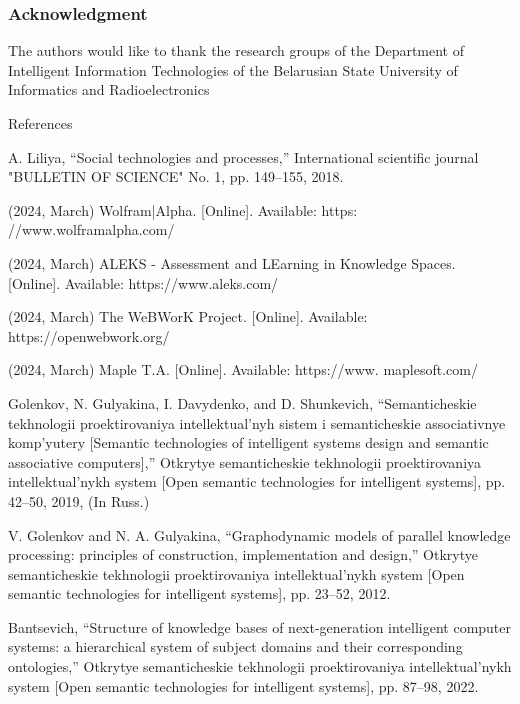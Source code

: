 \documentclass [11pt, a4paper]{article}
\begin{document}
\begin{multicols}{2}
\begin{center}
    \subsubsection*{\textmd{\normalsize{Acknowledgment}}}
\end{center}
\par \quad The authors would like to thank the research groups of the Department of Intelligent Information Technologies of the Belarusian State University of Informatics and Radioelectronics
\\\quad
\begin{center}
    References
\end{center}
\begin{enumerate}
  \scriptsize{\item A. Liliya, “Social technologies and processes,” International
scientific journal "BULLETIN OF SCIENCE" No. 1, pp. 149–155,
2018.
\item (2024, March) Wolfram|Alpha. [Online]. Available: https:
//www.wolframalpha.com/
\item(2024, March) ALEKS - Assessment and LEarning in Knowledge
Spaces. [Online]. Available: https://www.aleks.com/
\item (2024, March) The WeBWorK Project. [Online]. Available:
https://openwebwork.org/
\item (2024, March) Maple T.A. [Online]. Available: https://www.
maplesoft.com/
\item Golenkov, N. Gulyakina, I. Davydenko, and D. Shunkevich,
“Semanticheskie tekhnologii proektirovaniya intellektual’nyh
sistem i semanticheskie associativnye komp’yutery [Semantic
technologies of intelligent systems design and semantic
associative computers],” Otkrytye semanticheskie tekhnologii
proektirovaniya intellektual’nykh system [Open semantic
technologies for intelligent systems], pp. 42–50, 2019, (In Russ.)
\item V. Golenkov and N. A. Gulyakina, “Graphodynamic models
of parallel knowledge processing: principles of construction,
implementation and design,” Otkrytye semanticheskie tekhnologii
proektirovaniya intellektual’nykh system [Open semantic
technologies for intelligent systems], pp. 23–52, 2012.
\item Bantsevich, “Structure of knowledge bases of next-generation
intelligent computer systems: a hierarchical system of subject
domains and their corresponding ontologies,” Otkrytye semanticheskie tekhnologii proektirovaniya intellektual’nykh system [Open
semantic technologies for intelligent systems], pp. 87–98, 2022.
}
\end{enumerate}
\end{multicols}
\end{document}
